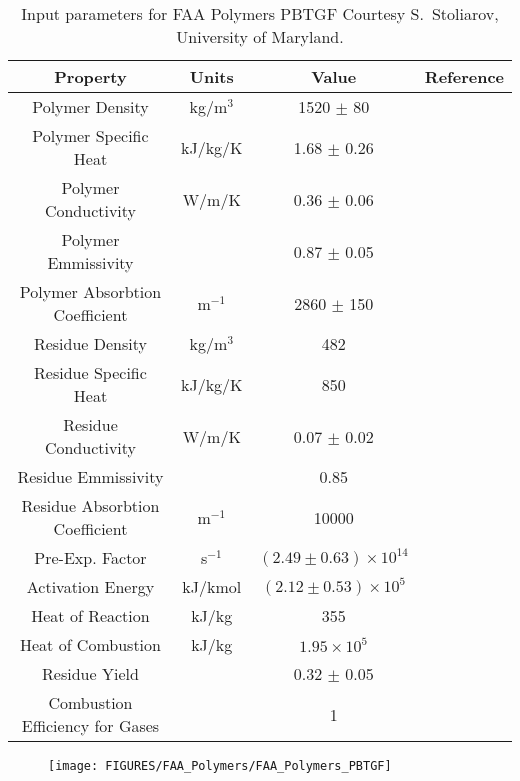\begin{table}[h!]
\caption[PBTGF.]{Input parameters for FAA Polymers PBTGF Courtesy S.~Stoliarov, University of Maryland.}
\begin{tabular}{|c|c|c|c|}
\hline
  Property &      Units &      Value &  Reference \\ \hline \hline
Polymer Density &     kg/m$^3$ &  1520 $\pm$ 80 & \cite{Kempel:1} \\ \hline
Polymer Specific Heat &    kJ/kg/K & 1.68 $\pm$ 0.26 & \cite{Kempel:1} \\ \hline
Polymer Conductivity &      W/m/K & 0.36 $\pm$ 0.06 & \cite{Kempel:1} \\ \hline
Polymer Emmissivity &            & 0.87 $\pm$ 0.05 & \cite{Linteris:2} \\ \hline
Polymer Absorbtion Coefficient &  m$^{-1}$  & 2860 $\pm$ 150 & \cite{Linteris:2} \\ \hline
Residue Density &     kg/m$^3$  &        482 & \cite{Kempel:1} \\ \hline
Residue Specific Heat &    kJ/kg/K &        850 & \cite{Kempel:1} \\ \hline
Residue Conductivity &      W/m/K & 0.07 $\pm$ 0.02 & \cite{Kempel:1} \\ \hline
Residue Emmissivity &            &       0.85 & \cite{Braeuer:1} \\ \hline
Residue Absorbtion Coefficient &      m$^{-1}$ &       10000  & \cite{Kempel:1} \\ \hline
Pre-Exp. Factor &       s$^{-1}$ &  $(2.49 \pm 0.63) \times 10^{14}$ & \cite{Kempel:1} \\ \hline
Activation Energy &    kJ/kmol & $(2.12 \pm 0.53) \times 10^{5}$ & \cite{Kempel:1} \\ \hline
Heat of Reaction &      kJ/kg &        355 & \cite{Kempel:1} \\ \hline
Heat of Combustion &      kJ/kg & $1.95 \times 10^{5}$ & \cite{Kempel:1} \\ \hline
Residue Yield &            & 0.32 $\pm$ 0.05 & \cite{Kempel:1} \\ \hline
Combustion Efficiency for Gases &            &          1 & \cite{Kempel:1} \\ \hline
\end{tabular}  
\end{table}

\begin{figure}[h!]
\texttt{[image: FIGURES/FAA\_Polymers/FAA\_Polymers\_PBTGF]}
\end{figure}


